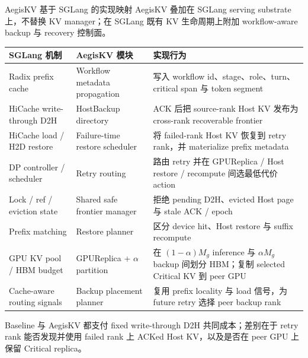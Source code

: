 \documentclass[aspectratio=43]{beamer}
\newcommand{\AegisKV}{AegisKV}
\newcommand{\Critical}{Critical}
\newcommand{\HostBackup}{HostBackup}
\newcommand{\GPUReplica}{GPUReplica}
\begin{document}
\begin{frame}{AegisKV 基于 SGLang 的实现映射}
  \scriptsize
  \AegisKV{} 叠加在 SGLang serving substrate 上，不替换 KV manager；在 SGLang 既有 KV 生命周期上附加 workflow-aware backup 与 recovery 控制面。

  \vspace{0.06cm}
  \renewcommand{\arraystretch}{1.08}
  \begin{tabular}{
    >{\raggedright\arraybackslash}p{}
    >{\raggedright\arraybackslash}p{}
    >{\raggedright\arraybackslash}p{}
  }
    \toprule
    SGLang 机制 & AegisKV 模块 & 实现行为 \\
    \midrule
    Radix prefix cache & Workflow metadata propagation & 写入 workflow id、stage、role、turn、critical span 与 token segment \\
    HiCache write-through D2H & \HostBackup{} directory & ACK 后把 source-rank Host KV 发布为 cross-rank recoverable frontier \\
    HiCache load / H2D restore & Failure-time restore scheduler & 将 failed-rank Host KV 恢复到 retry rank，并 materialize prefix metadata \\
    DP controller / scheduler & Retry routing & 路由 retry 并在 GPUReplica / Host restore / recompute 间选最低代价 action \\
    Lock / ref / eviction state & Shared safe frontier manager & 拒绝 pending D2H、evicted Host page 与 stale ACK / epoch \\
    Prefix matching & Restore planner & 区分 device hit、Host restore 与 suffix recompute \\
    GPU KV pool / HBM budget & \GPUReplica{} + $\alpha$ partition & 在 $(1-\alpha)M_g$ inference 与 $\alpha M_g$ backup 间划分 HBM；复制 selected \Critical{} KV 到 peer GPU \\
    Cache-aware routing signals & Backup placement planner & 复用 prefix locality 与 load 信号，为 future retry 选择 peer backup rank \\
    \bottomrule
  \end{tabular}

  \vspace{0.08cm}
  \footnotesize
  Baseline 与 \AegisKV{} 都支付 fixed write-through D2H 共同成本；差别在于 retry rank 能否发现并使用 failed rank 上 ACKed Host KV，以及是否在 peer GPU 上保留 \Critical{} replica。
\end{frame}
\end{document}
